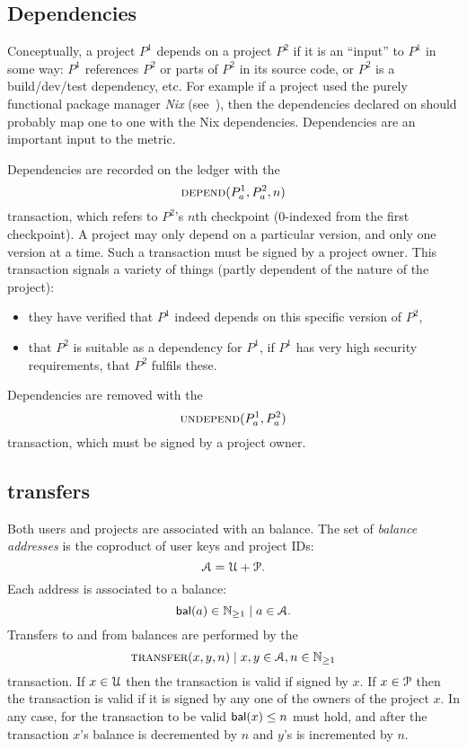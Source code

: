 \subsection{Dependencies}\label{s:dependencies}
Conceptually, a project $P^1$ depends on a project $P^2$ if it is an
``input'' to $P^1$ in some way: $P^1$ references $P^2$ or parts of
$P^2$ in its source code, or $P^2$ is a build/dev/test dependency,
etc. For example if a project used the purely functional package
manager \emph{Nix} (see~\cite{nix}), then the dependencies declared on
\oscoin{} should probably map one to one with the Nix
dependencies. Dependencies are an important input to the \osrank{}
metric.

Dependencies are recorded on the ledger with the
\[
    \text{\normalfont\scshape depend}\small{\lparen P^1_a, P^2_a, n\rparen}
\]
transaction, which refers to $P^2$'s $n$th checkpoint ($0$-indexed
from the first checkpoint). A project may only depend on a particular
version, and only one version at a
time. %
Such a transaction must be signed by a project owner. This transaction
signals a variety of things (partly dependent of the nature of the
project):
\begin{itemize}
\item they have verified that $P^1$ indeed depends on this specific
  version of $P^2$,
\item that $P^2$ is suitable as a dependency for $P^1$, \eg{} if $P^1$
  has very high security requirements, that $P^2$ fulfils these.
\end{itemize}

Dependencies are removed with the
\[
    \text{\normalfont\scshape undepend}\small{\lparen P^1_a, P^2_a\rparen}
\]
transaction, which must be signed by a project owner.


\def\posnat{\mathbb{N}_{\geq 1}}

\subsection{\oscoin{} transfers}

Both users and projects are associated with an \oscoin{} balance.  The
set of \emph{balance addresses} is the coproduct of user keys and
project IDs:
\[
\mathcal{A} = \mathcal{U} + \mathcal{P}.
\]
Each address is associated to a balance:
\[
\bal(a) \in \posnat \mid a \in \accAddrs.
\]
Transfers to and from balances are performed by the
\[
\text{\normalfont\scshape transfer}\small{\lparen x,y,n\rparen} \mid x,y \in \mathcal{A}, n \in \mathbb{N}_{\geq 1}
\]
transaction. If $x \in \mathcal{U}$ then the transaction is valid if signed
by $x$. If $x \in \mathcal{P}$ then the transaction is valid if it is
signed by any one of the owners of the project $x$. In any case, for
the transaction to be valid $\mathsf{bal}(x) \leq n$ must hold, and after the
transaction $x$'s balance is decremented by $n$ and $y$'s is
incremented by $n$.

